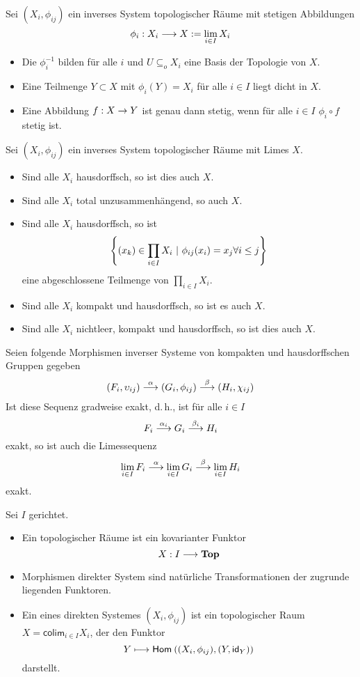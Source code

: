 \documentclass{book}
\renewcommand{\i}{^{-1}}
\begin{document}
\Prop{}
Sei $(X_i, \phi_{ij})$ ein inverses System topologischer Räume mit stetigen Abbildungen
\[ \phi_i : X_i \overset{}{\longrightarrow} X:= \lim\limits_{i \in I} X_i \]
\begin{itemize}
	\item Die $\phi_i\i$ bilden für alle $i$ und $U\subseteq_o X_i$ eine Basis der Topologie von $X$.
	\item Eine Teilmenge $Y \subset X$ mit $\phi_i(Y) = X_i$ für alle $i\in I$ liegt dicht in $X$.
	\item Eine Abbildung $f : X \overset{}{\rightarrow} Y$ ist genau dann stetig, wenn für alle $i \in I$ $\phi_i\circ f$ stetig ist.
\end{itemize}
\Prop{}
Sei $(X_i,\phi_{ij})$ ein inverses System topologischer Räume mit Limes $X$.
\begin{itemize}
	\item Sind alle $X_i$ hausdorffsch, so ist dies auch $X$.
	\item Sind alle $X_i$ total unzusammenhängend, so auch $X$.
	\item Sind alle $X_i$ hausdorffsch, so ist
	\[\set{(x_k) \in \prod_{i\in I}X_i }{ \phi_{ij}(x_i) = x_j \forall i \leq j }\]
	eine abgeschlossene Teilmenge von $\prod_{i \in I}X_i$.
	\item Sind alle $X_i$ kompakt und hausdorffsch, so ist es auch $X$.
	\item Sind alle $X_i$ nichtleer, kompakt und hausdorffsch, so ist dies auch $X$.
\end{itemize}
\Prop{}
Seien folgende Morphismen inverser Systeme von kompakten und hausdorffschen Gruppen gegeben
\begin{align*}
 (F_i, \upsilon_{ij}) \overset{\alpha}{\longrightarrow} (G_i, \phi_{ij}) \overset{\beta}{\longrightarrow} (H_i, \chi_{ij})
\end{align*}
Ist diese Sequenz gradweise exakt, d.\,h., ist für alle $i \in I$
\[ F_i \overset{\alpha_i}{\longrightarrow} G_i \overset{\beta_i}{\longrightarrow} H_i \]
exakt, so ist auch die Limessequenz
\[ \lim\limits_{i\in I} F_i \overset{\alpha}{\longrightarrow} \lim\limits_{i \in I}G_i \overset{\beta}{\longrightarrow} \lim\limits_{i \in I}H_i \]
exakt.

Sei $I$ gerichtet.
\begin{itemize}
	\item Ein  topologischer Räume ist ein kovarianter Funktor
	\[X : I \overset{}{\longrightarrow} \textbf{Top}\]
	\item Morphismen direkter System sind natürliche Transformationen der zugrunde liegenden Funktoren.
	\item Ein  eines direkten Systemes $(X_i, \phi_{ij})$ ist ein topologischer Raum $X = \textsf{colim}_{i\in I}X_i$, der den Funktor
	\[ Y \longmapsto \textsf{Hom}_{}\left((X_i,\phi_{ij}), (Y,\textsf{id}_{Y})\right) \]
	darstellt.
\end{itemize}
\end{document}

